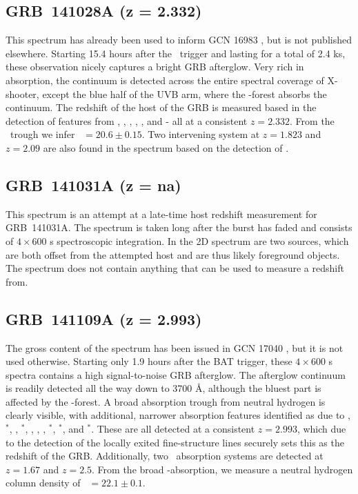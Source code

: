 \documentclass{aa}    %
\begin{document}
\subsection{GRB~141028A (z = 2.332)}\label{141028}

This spectrum has already been used to inform GCN 16983 \citep{GCN16983}, but is
not published elsewhere. Starting 15.4 hours after the \swift~trigger and
lasting for a total of 2.4 ks, these observation nicely captures a bright GRB
afterglow. Very rich in absorption, the continuum is detected across the entire
spectral coverage of X-shooter, except the blue half of the UVB arm, where the
\lya-forest absorbs the continuum. The redshift of the host of the GRB is
measured based in the detection of features from \lya, \SIii, \civ, \cii, \feii,
and \mgii - all at a consistent $z = 2.332$. From the \lya~trough we infer
\nh~$=20.6 \pm 0.15$. Two intervening system at $z = 1.823$ and $z = 2.09$ are
also found in the spectrum based on the detection of \civ.

\subsection{GRB~141031A  (z = na)}	\label{141031}

This spectrum is an attempt at a late-time host redshift measurement for
GRB~141031A. The spectrum is taken long after the burst has faded and consists
of $4\times600$ s spectroscopic integration. In the 2D spectrum are two sources,
which are both offset from the attempted host and are thus likely foreground
objects. The spectrum does not contain anything that can be used to measure a
redshift from.

\subsection{GRB~141109A (z = 2.993)}\label{141109}

The gross content of the spectrum has been issued in GCN 17040 \citep{GCN17040},
but it is not used otherwise. Starting only 1.9 hours after the BAT trigger,
these $4\times600$ s spectra contains a high signal-to-noise GRB afterglow. The
afterglow continuum is readily detected all the way down to 3700 \AA, although
the bluest part is affected by the \lya-forest. A broad absorption trough from
neutral hydrogen is clearly visible, with additional, narrower absorption
features identified as due to \SIii, \SIii$^*$, \cii, \cii$^*$, \SIiv, \civ,
\feii, \feii$^*$, \oi$^*$, and \nii$^*$. These are all detected at a consistent
$z = 2.993$, which due to the detection of the locally exited fine-structure
lines securely sets this as the redshift of the GRB. Additionally, two
\mgii~absorption systems are detected at $z = 1.67$ and $z=2.5$. From the broad
\lya-absorption, we measure a neutral hydrogen column density of \nh~$=22.1 \pm
0.1$.
\end{document}
